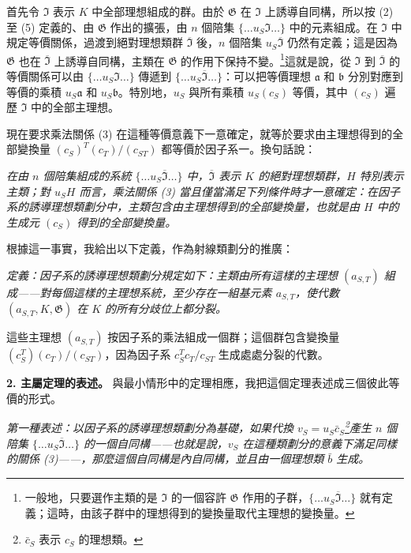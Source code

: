 \documentclass[11pt]{article}
\begin{document}
首先令 \(\mathfrak I\) 表示 \(K\) 中全部理想組成的群。由於 \(\mathfrak G\) 在 \(\mathfrak I\) 上誘導自同構，所以按 (2) 至 (5) 定義的、由 \(\mathfrak G\) 作出的擴張，由 \(n\) 個陪集 \(\{\ldots u_S\mathfrak I\ldots\}\) 中的元素組成。在 \(\mathfrak I\) 中規定等價關係，過渡到絕對理想類群 \(\overline{\mathfrak I}\) 後，\(n\) 個陪集 \(u_S\overline{\mathfrak I}\) 仍然有定義；這是因為 \(\mathfrak G\) 也在 \(\overline{\mathfrak I}\) 上誘導自同構，主類在 \(\mathfrak G\) 的作用下保持不變。\footnote{一般地，只要選作主類的是 \(\mathfrak I\) 的一個容許 \(\mathfrak G\) 作用的子群，\(\{\ldots u_S\overline{\mathfrak I}\ldots\}\) 就有定義；這時，由該子群中的理想得到的變換量取代主理想的變換量。}這就是說，從 \(\mathfrak I\) 到 \(\overline{\mathfrak I}\) 的等價關係可以由 \(\{\ldots u_S\mathfrak I\ldots\}\) 傳遞到 \(\{\ldots u_S\overline{\mathfrak I}\ldots\}\)：可以把等價理想 \(\mathfrak a\) 和 \(\mathfrak b\) 分別對應到等價的乘積 \(u_S\mathfrak a\) 和 \(u_S\mathfrak b\)。特別地，\(u_S\) 與所有乘積 \(u_S(c_S)\) 等價，其中 \((c_S)\) 遍歷 \(\mathfrak I\) 中的全部主理想。

現在要求乘法關係 (3) 在這種等價意義下一意確定，就等於要求由主理想得到的全部變換量 \((c_S)^T(c_T)/(c_{ST})\) 都等價於因子系一。換句話說：

\emph{在由 \(n\) 個陪集組成的系統 \(\{\ldots u_S\overline{\mathfrak I}\ldots\}\) 中，\(\overline{\mathfrak I}\) 表示 \(K\) 的絕對理想類群，\(H\) 特別表示主類；對 \(u_SH\) 而言，乘法關係 (3) 當且僅當滿足下列條件時才一意確定：在因子系的誘導理想類劃分中，主類包含由主理想得到的全部變換量，也就是由 \(H\) 中的生成元 \((c_S)\) 得到的全部變換量。}

根據這一事實，我給出以下定義，作為射線類劃分的推廣：

\emph{定義：因子系的誘導理想類劃分規定如下：主類由所有這樣的主理想 \((a_{S,T})\) 組成——對每個這樣的主理想系統，至少存在一組基元素 \(a_{S,T}\)，使代數 \((a_{S,T},K,\mathfrak G)\) 在 \(K\) 的所有分歧位上都分裂。}

這些主理想 \((a_{S,T})\) 按因子系的乘法組成一個群；這個群包含變換量 \((c_S^T)(c_T)/(c_{ST})\)，因為因子系 \(c_S^Tc_T/c_{ST}\) 生成處處分裂的代數。

\noindent\textbf{2. 主屬定理的表述。} 與最小情形中的定理相應，我把這個定理表述成三個彼此等價的形式。

\emph{第一種表述：以因子系的誘導理想類劃分為基礎，如果代換 \(v_S=u_S\bar c_S\)\footnote{\(\bar c_S\) 表示 \(c_S\) 的理想類。}產生 \(n\) 個陪集 \(\{\ldots u_S\overline{\mathfrak I}\ldots\}\) 的一個自同構——也就是說，\(v_S\) 在這種類劃分的意義下滿足同樣的關係 (3)——，那麼這個自同構是內自同構，並且由一個理想類 \(\bar b\) 生成。}
\end{document}
